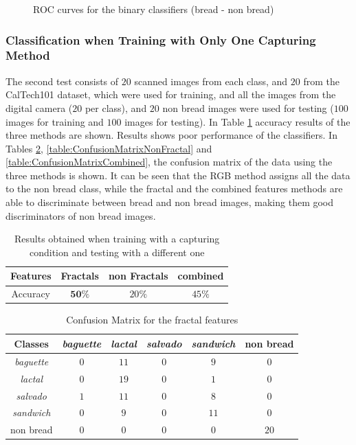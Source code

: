 \documentclass[oneside,a4paper,english,links]{amca}
\begin{document}
\begin{figure}
\caption{ROC curves for the binary classifiers (bread - non bread)}

\end{figure}

\subsubsection{Classification when Training with Only One Capturing Method}
The second test consists of $20$ scanned images from each class, and $20$ from the CalTech101 dataset, which were used for training, and all the images from the digital camera ($20$ per class), and $20$ non bread images were used for testing ($100$ images for training and $100$ images for testing). In Table \ref{table:tableRobustnessTest2} accuracy results of the three methods are shown. Results shows poor performance of the classifiers. In Tables \ref{table:ConfusionMatrixFractal}, \ref{table:ConfusionMatrixNonFractal} and \ref{table:ConfusionMatrixCombined}, the confusion matrix of the data using the three methods is shown. It can be seen that the RGB method assigns all the data to the non bread class, while the fractal and the combined features methods are able to discriminate between bread and non bread images, making them good discriminators of non bread images.

\begin{table}[htb]
\centering
\begin{tabular}{|c|c|c|c|}
    \hline
    Features & Fractals & non Fractals & combined\\
    \hline
    \hline
    Accuracy  & $\textbf{50}\%$ & $20\%$ & $45\%$\\
    \hline
\end{tabular}
\caption{Results obtained when training with a capturing condition and testing with a different one}
\label{table:tableRobustnessTest2}
\end{table}


\begin{table}[htb]
\centering
\begin{tabular}{|c|c|c|c|c|c|}
    \hline
    Classes & {\em baguette} & {\em lactal} & {\em salvado} & {\em sandwich} & non bread\\
    \hline
    \hline
    {\em baguette}  & $0$ & $11$ & $0$ & $9$  & $0$\\
    \hline
    {\em lactal}    & $0$ & $19$ & $0$ & $1$  & $0$\\
    \hline
    {\em salvado}   & $1$ & $11$ & $0$ & $8$  & $0$\\
    \hline
    {\em sandwich}  & $0$ & $9$  & $0$ & $11$ & $0$\\
    \hline
    non bread       & $0$ & $0$  & $0$ & $0$  & $20$\\
    \hline
\end{tabular}
\caption{Confusion Matrix for the fractal features}
\label{table:ConfusionMatrixFractal}
\end{table}
\end{document}
